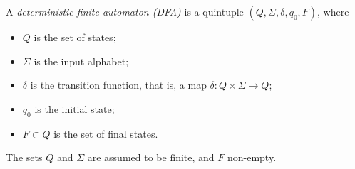 

\setcounter{section}{1}
\setcounter{subsection}{2}
\setcounter{dfn}{1}

\begin{dfn}
A \emph{deterministic finite automaton (DFA)} is a quintuple $(Q, \Sigma, \delta, q_0, F)$, where
\begin{itemize}
\item
$Q$ is the set of states;
\item
$\Sigma$ is the input alphabet;
\item
$\delta$ is the transition function, that is, a map $\delta \colon Q \times \Sigma \to Q$;
\item
$q_0$ is the initial state;
\item
$F \subset Q$ is the set of final states.
\end{itemize}
The sets $Q$ and $\Sigma$ are assumed to be finite, and $F$ non-empty.
\end{dfn}

